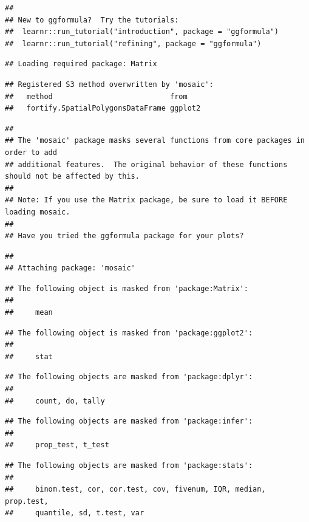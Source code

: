 \documentclass[
]{book}
\begin{document}
\begin{verbatim}
## 
## New to ggformula?  Try the tutorials: 
## 	learnr::run_tutorial("introduction", package = "ggformula")
## 	learnr::run_tutorial("refining", package = "ggformula")
\end{verbatim}

\begin{verbatim}
## Loading required package: Matrix
\end{verbatim}

\begin{verbatim}
## Registered S3 method overwritten by 'mosaic':
##   method                           from   
##   fortify.SpatialPolygonsDataFrame ggplot2
\end{verbatim}

\begin{verbatim}
## 
## The 'mosaic' package masks several functions from core packages in order to add 
## additional features.  The original behavior of these functions should not be affected by this.
## 
## Note: If you use the Matrix package, be sure to load it BEFORE loading mosaic.
## 
## Have you tried the ggformula package for your plots?
\end{verbatim}

\begin{verbatim}
## 
## Attaching package: 'mosaic'
\end{verbatim}

\begin{verbatim}
## The following object is masked from 'package:Matrix':
## 
##     mean
\end{verbatim}

\begin{verbatim}
## The following object is masked from 'package:ggplot2':
## 
##     stat
\end{verbatim}

\begin{verbatim}
## The following objects are masked from 'package:dplyr':
## 
##     count, do, tally
\end{verbatim}

\begin{verbatim}
## The following objects are masked from 'package:infer':
## 
##     prop_test, t_test
\end{verbatim}

\begin{verbatim}
## The following objects are masked from 'package:stats':
## 
##     binom.test, cor, cor.test, cov, fivenum, IQR, median, prop.test,
##     quantile, sd, t.test, var
\end{verbatim}
\end{document}
